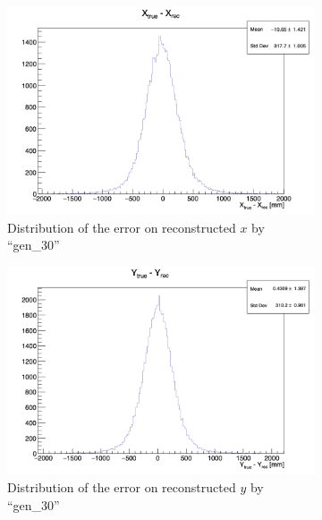 \documentclass[../main.tex]{subfiles}
\begin{document}
\begin{figure}[ht]
  \centering
  \begin{subfigure}[t]{0.32\linewidth}
    \centering
    \includegraphics[width=\linewidth]{images/jcnn/vic_cnn/cnn_delta_x.png}
    \caption{Distribution of the error on reconstructed $x$ by ``gen\_30''}
    \label{fig:jcnn:vic_cnn:cnn_delta_x}
  \end{subfigure}
  \begin{subfigure}[t]{0.32\linewidth}
    \centering
    \includegraphics[width=\linewidth]{images/jcnn/vic_cnn/cnn_delta_y.png}
    \caption{Distribution of the error on reconstructed $y$ by ``gen\_30''}
    \label{fig:jcnn:vic_cnn:cnn_delta_y}
  \end{subfigure}
  \begin{subfigure}[t]{0.32\linewidth}
    \centering

\end{subfigure}
\end{figure}
\end{document}
